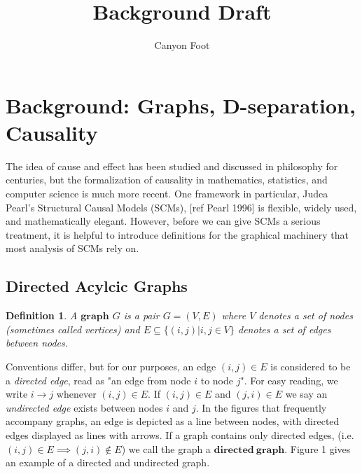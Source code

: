 \documentclass[12pt]{article}
\title{\vspace{-3cm} Background Draft}
\author{Canyon Foot}
\newtheorem{definition}{Definition}[section]
\theoremstyle{definition}
\begin{document}
\maketitle

\section{Background: Graphs, D-separation, Causality}
The idea of cause and effect has been studied and discussed in philosophy for centuries, but  the formalization of causality in mathematics, statistics, and computer science is much more recent. One framework in particular, Judea Pearl's Structural Causal Models (SCMs),  [ref Pearl 1996] is flexible, widely used, and mathematically elegant. However, before we can give SCMs a serious treatment, it is helpful to introduce definitions for the graphical machinery that most analysis of SCMs rely on.

\subsection{Directed Acylcic Graphs}
\theoremstyle{definition}
\begin{definition}
A $\mathbf{graph}$ $G$ is a pair $G = (V, E)$ where $V$ denotes a set of nodes (sometimes called vertices) and $E \subseteq \{(i,j) | i,j \in V\}$ denotes a set of edges between nodes.
\end{definition}
Conventions differ, but for our purposes, an edge $(i,j) \in E$ is considered to be a \emph{directed edge},  read as "an edge from node $i$ to node $j$".  For easy reading, we write $i \rightarrow j$ whenever $(i,j) \in E$. If  $(i,j) \in E$ and $(j,i) \in E$ we say an \emph{undirected edge} exists between nodes $i$ and $j$.  In the figures that frequently accompany graphs, an edge is depicted as a line between nodes, with directed edges displayed as lines with arrows.  If a graph  contains only directed edges, (i.e. $(i,j) \in E \implies (j,i) \notin E$) we call the graph a $\mathbf{directed \ graph}$.  Figure 1 gives an example of a directed and undirected graph. 
\end{document}
